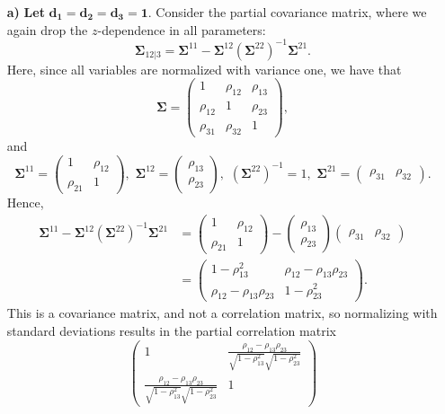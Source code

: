 \documentclass[
  12pt,
  letterpaper]{article}
\numberwithin{equation}{section}
\newcommand{\fSigma}{\bm{\Sigma}}
\begin{document}
\begin{itemize}
\item[\textbf{a)}] \textbf{Let} $\bm{d_1 = d_2 = d_3 = 1}$. Consider the partial covariance matrix, where we again drop the $z$-dependence in all parameters: 
$$\fSigma_{12|3} = \fSigma^{11} - \fSigma^{12}\left(\fSigma^{22}\right)^{-1}\fSigma^{21}.$$
Here, since all variables are normalized with variance one, we have that
$$\fSigma = \begin{pmatrix} 1 & \rho_{12} & \rho_{13} \\ \rho_{12} & 1 & \rho_{23} \\ \rho_{31} & \rho_{32} & 1 \end{pmatrix},$$
and 
$$\fSigma^{11} = \begin{pmatrix} 1 & \rho_{12} \\ \rho_{21} & 1 \end{pmatrix}, \,\, \fSigma^{12} = \begin{pmatrix} \rho_{13} \\ \rho_{23} \end{pmatrix},\,\, \left(\fSigma^{22}\right)^{-1} = 1, \,\, \fSigma^{21} = \begin{pmatrix} \rho_{31} & \rho_{32} \end{pmatrix}.$$
Hence,
\begin{align*}
\fSigma^{11} - \fSigma^{12}\left(\fSigma^{22}\right)^{-1}\fSigma^{21} &=  \begin{pmatrix} 1 & \rho_{12} \\ \rho_{21} & 1 \end{pmatrix} - \begin{pmatrix} \rho_{13} \\ \rho_{23} \end{pmatrix} \begin{pmatrix} \rho_{31} & \rho_{32} \end{pmatrix} \\
&= \begin{pmatrix} 1 - \rho_{13}^2 & \rho_{12} - \rho_{13}\rho_{23} \\ \rho_{12} - \rho_{13}\rho_{23} & 1 - \rho_{23}^2 \end{pmatrix}.
\end{align*}
This is a covariance matrix, and not a correlation matrix, so normalizing with standard deviations results in the partial correlation matrix
\begin{equation}
\begin{pmatrix}
1 & \frac{\rho_{12} - \rho_{13}\rho_{23}}{\sqrt{1-\rho_{13}^2}\sqrt{1-\rho_{23}^2}} \\  \frac{\rho_{12} - \rho_{13}\rho_{23}}{\sqrt{1-\rho_{13}^2}\sqrt{1-\rho_{23}^2}} & 1 

\end{pmatrix}
\end{equation}
\end{itemize}
\end{document}
